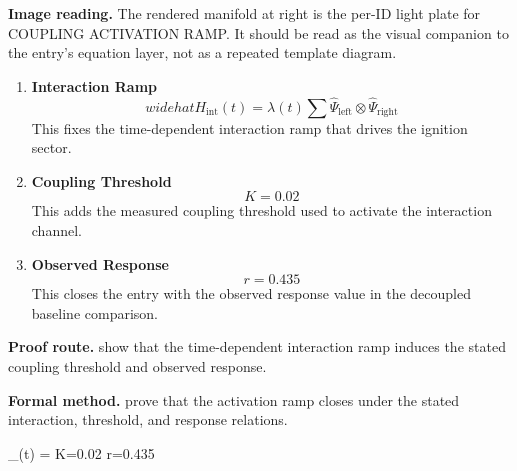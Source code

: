 \begin{samepage}
\noindent\begin{minipage}[t]{0.45\linewidth}
\vspace{0pt}
\raggedright
\scriptsize\textbf{Image reading.} The rendered manifold at right is the per-ID light plate for COUPLING ACTIVATION RAMP. It should be read as the visual companion to the entry's equation layer, not as a repeated template diagram.\par
\end{minipage}\hfill
\begin{minipage}[t]{0.53\linewidth}
\vspace*{-0.10in}
\raggedright
{}
\end{minipage}
\end{samepage}

\clearpage


\begin{enumerate}[leftmargin=1.6em,itemsep=9pt,topsep=6pt]
\item \textbf{Interaction Ramp}
\[
widehat{H}_{\mathrm{int}}(t)=\lambda(t)\sum \widehat{\Psi}_{\mathrm{left}}\otimes \widehat{\Psi}_{\mathrm{right}}
\]
This fixes the time-dependent interaction ramp that drives the ignition sector.

\item \textbf{Coupling Threshold}
\[
K=0.02
\]
This adds the measured coupling threshold used to activate the interaction channel.

\item \textbf{Observed Response}
\[
r=0.435
\]
This closes the entry with the observed response value in the decoupled baseline comparison.
\end{enumerate}

\textbf{Proof route.} show that the time-dependent interaction ramp induces the stated coupling threshold and observed response.

\textbf{Formal method.} prove that the activation ramp closes under the stated interaction, threshold, and response relations.

\medskip
{}

\begin{tzpsnapshot}
\end{tzpsnapshot}

\tzpequationlinks
  {_{}(t) = \cdots}
  {K=0.02}
  {r=0.435}
